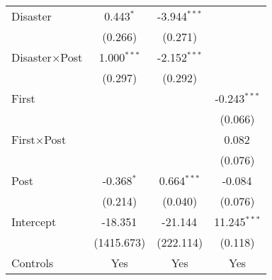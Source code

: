 \begin{tabular}{@{\extracolsep{5pt}}lccc}
    Disaster            & 0.443$^{*}$                                                          & -3.944$^{***}$ &                  \\
                        & (0.266)                                                              & (0.271)        &                  \\
    Disaster$\times$Post       & 1.000$^{***}$                                                        & -2.152$^{***}$ &                  \\
                        & (0.297)                                                              & (0.292)        &                  \\
    First               &                                                                      &                & -0.243$^{***}$   \\
                        &                                                                      &                & (0.066)          \\
    First$\times$Post          &                                                                      &                & 0.082$^{}$       \\
                        &                                                                      &                & (0.076)          \\
    Post                & -0.368$^{*}$                                                         & 0.664$^{***}$  & -0.084$^{}$      \\
                        & (0.214)                                                              & (0.040)        & (0.076)          \\
    Intercept           & -18.351$^{}$                                                         & -21.144$^{}$   & 11.245$^{***}$   \\
                        & (1415.673)                                                           & (222.114)      & (0.118)          \\
    Controls            & Yes                                                                  & Yes            & Yes              \\

\end{tabular}
